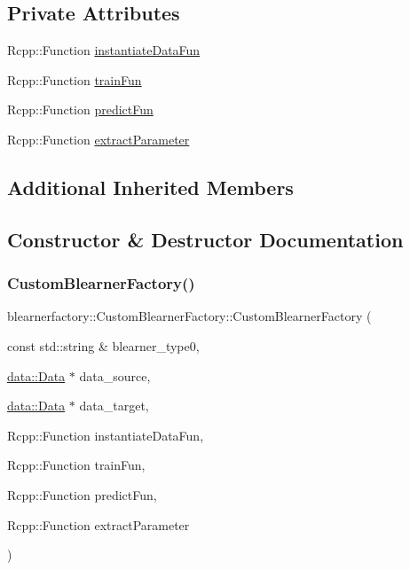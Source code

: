 \subsection*{Private Attributes}
\begin{DoxyCompactItemize}
\item 
Rcpp\+::\+Function \hyperlink{classblearnerfactory_1_1_custom_blearner_factory_a4237eeedc4a844cd02c52671a1f9191f}{instantiate\+Data\+Fun}
\item 
Rcpp\+::\+Function \hyperlink{classblearnerfactory_1_1_custom_blearner_factory_ac342da04b06c4e707811e4b312ce6c61}{train\+Fun}
\item 
Rcpp\+::\+Function \hyperlink{classblearnerfactory_1_1_custom_blearner_factory_a6cf80331e6ce5d8cabb25d7af09f9eea}{predict\+Fun}
\item 
Rcpp\+::\+Function \hyperlink{classblearnerfactory_1_1_custom_blearner_factory_a4db9694f117bf43facdb7522d8cd0de1}{extract\+Parameter}
\end{DoxyCompactItemize}
\subsection*{Additional Inherited Members}


\subsection{Constructor \& Destructor Documentation}
\mbox{\label{classblearnerfactory_1_1_custom_blearner_factory_a1a006cb772dc79cbcbcab810f5431b2c}} 
\subsubsection{\texorpdfstring{Custom\+Blearner\+Factory()}{CustomBlearnerFactory()}}
{\footnotesize\ttfamily blearnerfactory\+::\+Custom\+Blearner\+Factory\+::\+Custom\+Blearner\+Factory (\begin{DoxyParamCaption}\item[{const std\+::string \&}]{blearner\+\_\+type0,  }\item[{\hyperlink{classdata_1_1_data}{data\+::\+Data} $\ast$}]{data\+\_\+source,  }\item[{\hyperlink{classdata_1_1_data}{data\+::\+Data} $\ast$}]{data\+\_\+target,  }\item[{Rcpp\+::\+Function}]{instantiate\+Data\+Fun,  }\item[{Rcpp\+::\+Function}]{train\+Fun,  }\item[{Rcpp\+::\+Function}]{predict\+Fun,  }\item[{Rcpp\+::\+Function}]{extract\+Parameter }\end{DoxyParamCaption})}

